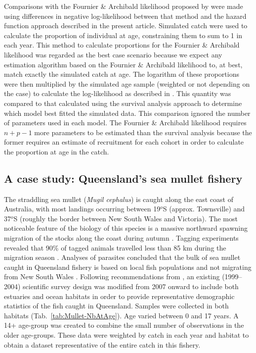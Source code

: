 \documentclass[12pt]{article}
\begin{document}
Comparisons with the Fournier \& Archibald likelihood proposed by \cite{Four82a} were made using differences in negative log-likelihood between that method and the hazard function approach described in the present article. Simulated catch were used to calculate the proportion of individual at age, constraining them to sum to 1 in each year. This method to calculate proportions for the Fournier \& Archibald likelihood was regarded as the best case scenario because we expect any estimation algorithm based on the Fournier \& Archibald likelihood to, at best, match exactly the simulated catch at age. The logarithm of these proportions were then multiplied by the simulated age sample (weighted or not depending on the case) to calculate the log-likelihood as described in \cite{Four82a}. This quantity was compared to that calculated using the survival analysis approach to determine which model best fitted the simulated data. This comparison ignored the number of parameters used in each model. The Fournier \& Archibald likelihood requires $n+p-1$ more parameters to be estimated than the survival analysis because the former requires an estimate of recruitment for each cohort in order to calculate the proportion at age in the catch.

\subsection{A case study: Queensland's sea mullet fishery}

The straddling sea mullet ({\it Mugil cephalus}) is caught along the east coast of Australia, with most landings occurring between 19$^{o}$S (approx. Townsville) and 37$^{o}$S (roughly the border between New South Wales and Victoria). The most noticeable feature of the biology of this species is a massive northward spawning migration of the stocks along the coast during autumn \citep{Kesteven53a}. Tagging experiments revealed that 90\% of tagged animals travelled less than 85 km during the migration season \citep{Kesteven53a}. Analyses of parasites concluded that the bulk of sea mullet caught in Queensland fishery is based on local fish populations and not migrating from New South Wales \citep{Lester2009129}. Following recommendations from \cite{Bell2005r}, an existing (1999--2004) scientific survey design was modified from 2007 onward to include both estuaries and ocean habitats in order to provide representative demographic statistics of the fish caught in Queensland. Samples were collected in both habitats (Tab.~\ref{tab:Mullet-NbAtAge}). Age varied between 0 and 17 years. A 14+ age-group was created to combine the small number of observations in the older age-groups. These data were weighted by catch in each year and habitat to obtain a dataset representative of the entire catch in this fishery. \\
\end{document}
